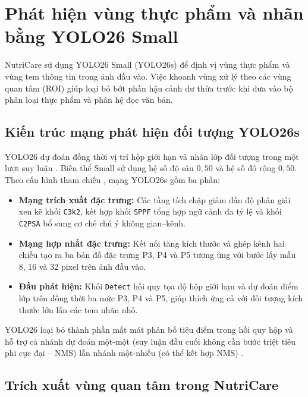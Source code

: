 \section{Phát hiện vùng thực phẩm và nhãn bằng YOLO26 Small}
\label{sec:yolo-object-detection}

NutriCare sử dụng YOLO26 Small (YOLO26s) để định vị vùng thực phẩm và vùng tem thông tin trong ảnh đầu vào. Việc khoanh vùng xử lý theo các vùng quan tâm (ROI) giúp loại bỏ bớt phần hậu cảnh dư thừa trước khi đưa vào bộ phân loại thực phẩm và phân hệ đọc văn bản.

\subsection{Kiến trúc mạng phát hiện đối tượng YOLO26s}
\label{subsec:yolo-architecture}

YOLO26 dự đoán đồng thời vị trí hộp giới hạn và nhãn lớp đối tượng trong một lượt suy luận \cite{redmon2016you,jocher2026yolo26}. Biến thể Small sử dụng hệ số độ sâu $0{,}50$ và hệ số độ rộng $0{,}50$. Theo cấu hình tham chiếu \cite{ultralyticsYolo26Config}, mạng YOLO26s gồm ba phần:

\begin{itemize}[leftmargin=0.8cm, label=\textbullet, itemsep=2pt, topsep=2pt]
    \item \textbf{Mạng trích xuất đặc trưng:} Các tầng tích chập giảm dần độ phân giải xen kẽ khối \texttt{C3k2}, kết hợp khối \texttt{SPPF} tổng hợp ngữ cảnh đa tỷ lệ và khối \texttt{C2PSA} bổ sung cơ chế chú ý không gian--kênh.
    \item \textbf{Mạng hợp nhất đặc trưng:} Kết nối tăng kích thước và ghép kênh hai chiều tạo ra ba bản đồ đặc trưng P3, P4 và P5 tương ứng với bước lấy mẫu 8, 16 và 32 pixel trên ảnh đầu vào.
    \item \textbf{Đầu phát hiện:} Khối \texttt{Detect} hồi quy tọa độ hộp giới hạn và dự đoán điểm lớp trên đồng thời ba mức P3, P4 và P5, giúp thích ứng cả với đối tượng kích thước lớn lẫn các tem nhãn nhỏ.
\end{itemize}

YOLO26 loại bỏ thành phần mất mát phân bố tiêu điểm trong hồi quy hộp và hỗ trợ cả nhánh dự đoán một-một (suy luận đầu cuối không cần bước triệt tiêu phi cực đại -- NMS) lẫn nhánh một-nhiều (có thể kết hợp NMS) \cite{jocher2026yolo26}.

\subsection{Trích xuất vùng quan tâm trong NutriCare}
\label{subsec:yolo-roi-extraction}

